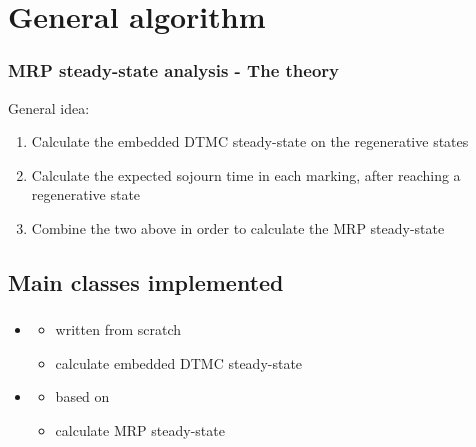 \section{General algorithm}
\begin{frame}
  \frametitle{\acs{MRP} steady-state analysis - The theory}
  General idea:
  \begin{enumerate}
  \item<2-> Calculate the embedded \acs{DTMC} steady-state on the
    regenerative states
  \item<3-> Calculate the expected sojourn time in each marking, after
    reaching a regenerative state
  \item<4-> Combine the two above in order to calculate the \acs{MRP} steady-state
  \end{enumerate}
  \begin{center}
  \end{center}
\end{frame}

\subsection{Main classes implemented}
\begin{frame}
  \frametitle{\insertsubsection}
  \begin{itemize}
	  \item {}
	  \begin{itemize}
	  	\item written from scratch
	  	\item calculate embedded \acs{DTMC} steady-state
	  \end{itemize}
	  \item {}
	  \begin{itemize}
	  	\item based on 
	  	\item calculate \acs{MRP} steady-state
	  \end{itemize}
  \end{itemize}
\end{frame}

